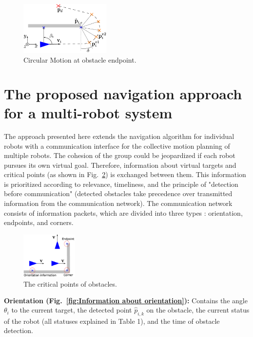 \documentclass[conference]{IEEEtran}
\begin{document}
\begin{figure}[h]
    \centering
    \includegraphics[width=0.4\textwidth]{Pictures/Circular Motion at obstacle endpoint.png}
    \caption{Circular Motion at obstacle endpoint.}
    \label{fig:Circular Motion at obstacle endpoint}
\end{figure}


\section{The proposed navigation approach for a multi-robot system}
The approach presented here extends the navigation algorithm for individual robots 
with a communication interface for the collective motion planning of multiple 
robots. The cohesion of the group could be jeopardized if each robot 
pursues its own virtual goal. Therefore, information about virtual 
targets and critical points 
(as shown in Fig.~\ref{fig:The critical points of obstacles}) is exchanged between them. 
This information is prioritized according to relevance, timeliness, and the principle of "detection before 
communication" (detected obstacles take precedence over transmitted 
information from the communication network).
The communication network consists of information packets, which are divided into three types
: orientation, endpoints, and corners.

\begin{figure}[h]
    \centering
    \includegraphics[width=0.25\textwidth]{Pictures/The critical points of obstacles.png}
    \caption{The critical points of obstacles.}
    \label{fig:The critical points of obstacles}
\end{figure}

\textbf{Orientation (Fig.~\ref{fig:Information about orientation}):} 
Contains the angle \( \theta_i \) to the current target, the detected 
point \( \hat{p}_{i,k} \) on the obstacle, the current status of the 
robot (all statuses explained in Table 1), and the time of obstacle detection.
\end{document}
